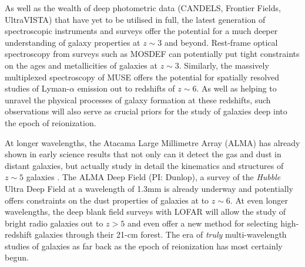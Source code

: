 As well as the wealth of deep photometric data (CANDELS, Frontier Fields, UltraVISTA) that have yet to be utilised in full, the latest generation of spectroscopic instruments and surveys offer the potential for a much deeper understanding of galaxy properties at $z\sim3$ and beyond. Rest-frame optical spectroscopy from surveys such as MOSDEF \citep{2015ApJS..218...15K} can potentially put tight constraints on the ages and metallicities of galaxies at $z\sim3$. Similarly, the massively multiplexed spectroscopy of MUSE \citep{Bacon:2015eh} offers the potential for spatially resolved studies of Lyman-$\alpha$ emission out to redshifts of $z\sim6$. As well as helping to unravel the physical processes of galaxy formation at these redshifts, such observations will also serve as crucial priors for the study of galaxies deep into the epoch of reionization.

At longer wavelengths, the Atacama Large Millimetre Array (ALMA) has already shown in early science results that not only can it detect the gas and dust in distant galaxies, but actually study in detail the kinematics and structures of $z\sim5$ galaxies \citep{DeBreuck:2014eo}. The ALMA Deep Field (PI: Dunlop), a survey of the \emph{Hubble} Ultra Deep Field at a wavelength of 1.3mm is already underway and potentially offers constraints on the dust properties of galaxies at to $z\sim6$. At even longer wavelengths, the deep blank field surveys with LOFAR will allow the study of bright radio galaxies out to $z>5$ and even offer a new method for selecting high-redshift galaxies through their 21-cm forest. The era of \emph{truly} multi-wavelength studies of galaxies as far back as the epoch of reionization has most certainly begun.
